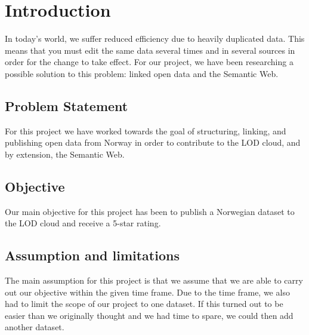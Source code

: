 \chapter{Introduction}
In today’s world, we suffer reduced efficiency due to heavily duplicated data. This means that you must edit the same data several times and in several sources in order for the change to take effect. For our project, we have been researching a possible solution to this problem: linked open data and the Semantic Web.

\section{Problem Statement}
For this project we have worked towards the goal of structuring, linking, and publishing open data from Norway in order to contribute to the LOD cloud, and by extension, the Semantic Web.

\section{Objective}
Our main objective for this project has been to publish a Norwegian dataset to the LOD cloud and receive a 5-star rating.

\section{Assumption and limitations}
The main assumption for this project is that we assume that we are able to carry out our objective within the given time frame. Due to the time frame, we also had to limit the scope of our project to one dataset. If this turned out to be easier than we originally thought and we had time to spare, we could then add another dataset.
